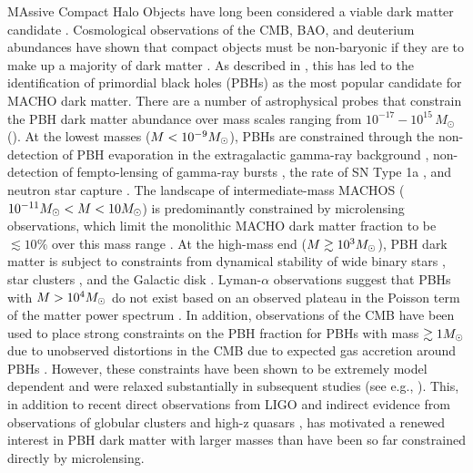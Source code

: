 
MAssive Compact Halo Objects \citep[MACHOs;][]{1991ApJ...366..412G} have long been considered a viable dark matter candidate \citep{1974ApJ...193L...1O, 1980ApJS...44...73B, 1981ApJ...243..140G, 1986ApJ...304....1P, Bird:2016}. 
Cosmological observations of the CMB, BAO, and deuterium abundances have shown that compact objects must be non-baryonic if they are to make up a majority of dark matter \citep[\eg][]{Ade:2015xua}. 
As described in , this has led to the identification of primordial black holes (PBHs) as the most popular candidate for MACHO dark matter.
There are a number of astrophysical probes that constrain the PBH dark matter abundance over mass scales ranging from $10^{-17}-10^{15}\,M_\odot$ ().
At the lowest masses ($M < 10^{-9}M_\odot$), PBHs are constrained through the non-detection of PBH evaporation in the extragalactic gamma-ray background \citep[\eg,][]{2010PhRvD..81j4019C}, non-detection of fempto-lensing of gamma-ray bursts \citep[\eg,][]{2012PhRvD..86d3001B}, the rate of SN Type 1a \citep{1805.07381}, and neutron star capture \citep[\eg,][]{2013PhRvD..87l3524C}.
The landscape of intermediate-mass MACHOS ($10^{-11} M_\odot < M < 10 M_\odot$) is predominantly constrained by microlensing observations, which limit the monolithic MACHO dark matter fraction to be $\lesssim 10\%$ over this mass range \citep[\eg][]{Alcock:2001,Tisserand:2007,1701.02151}.
At the high-mass end ($M \gtrsim 10^3M_\odot$), PBH dark matter is subject to constraints from dynamical stability of wide binary stars \citep[\eg][]{Yoo:2004}, star clusters \citep[\eg]{Brandt:2016}, and the Galactic disk \citep[\eg][]{Lacey:1985}.
Lyman-$\alpha$ observations suggest that PBHs with $M > 10^4M_\odot$ do not exist based on an observed plateau in the Poisson term of the matter power spectrum \citep{astro-ph/0302035}.
In addition, observations of the CMB have been used to place strong constraints on the PBH fraction for PBHs with mass $\gtrsim 1 M_\odot$ due to unobserved distortions in the CMB due to expected gas accretion around PBHs \citep{2008ApJ...680..829R}.
However, these constraints have been shown to be extremely model dependent and were relaxed substantially in subsequent studies (see e.g., \citealt{1612.05644}).
This, in addition to recent direct observations from LIGO \citep{1602.03837} and indirect evidence from observations of globular clusters \citep{???} and high-z quasars \citep{???}, has motivated a renewed interest in PBH dark matter with larger masses than have been so far constrained directly by microlensing.

